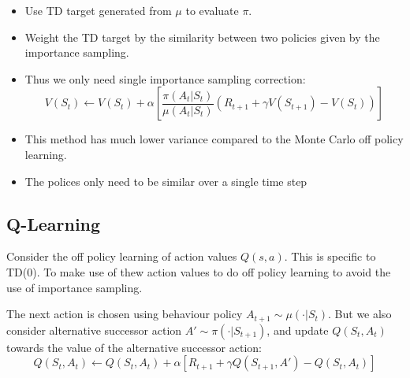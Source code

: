 \begin{itemize}
  \item Use TD target generated from \(\mu\) to evaluate \(\pi\).
  \item Weight the TD target by the similarity between two policies given by the importance
  sampling.
  \item Thus we only need single importance sampling correction:
  \[
    V(S_t) \leftarrow V(S_t) + \alpha \left[
    \frac{\pi(A_t|S_t)}{\mu(A_t|S_t)} \left( 
      R_{t+1} + \gamma V(S_{t+1}) - V(S_t)
    \right) 
    \right]
  \]
\item This method has much lower variance compared to the Monte Carlo off policy learning.
\item The polices only need to be similar over a single time step
\end{itemize}

\subsection{Q-Learning}
Consider the off policy learning of action values \(Q(s,a)\). This is specific to TD(0).
To make use of thew action values to do off policy learning to avoid the use of importance
sampling.

The next action is chosen using behaviour policy \(A_{t+1} \sim \mu(\cdot|S_{t})\). 
But we also consider alternative successor action \(A' \sim \pi(\cdot|S_{t+1})\),
and update \(Q(S_t,A_t)\) towards the value of the alternative successor action:
\[
    Q(S_t, A_t) \leftarrow Q(S_t, A_t) + \alpha \left[ 
      R_{t+1} + \gamma Q(S_{t+1}, A') - Q(S_t, A_t)
    \right]
\]

